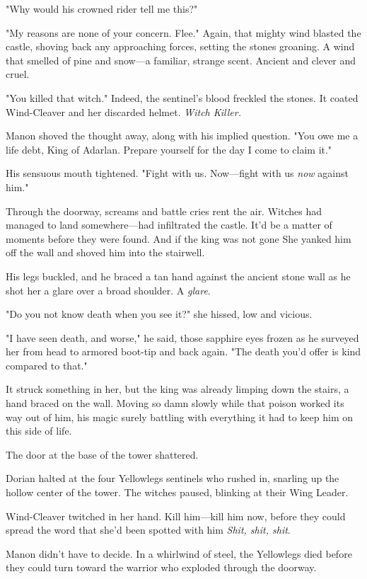 "Why would his crowned rider tell me this?"

"My reasons are none of your concern.
Flee."
Again, that mighty wind blasted the castle, shoving back any approaching forces, setting the stones groaning.
A wind that smelled of pine and snow---a familiar, strange scent.
Ancient and clever and cruel.

"You killed that witch."
Indeed, the sentinel's blood freckled the stones.
It coated Wind-Cleaver and her discarded helmet.
\emph{Witch Killer.}

Manon shoved the thought away, along with his implied question.
"You owe me a life debt, King of Adarlan.
Prepare yourself for the day I come to claim it."

His sensuous mouth tightened.
"Fight with us.
Now---fight with us \emph{now} against him."

Through the doorway, screams and battle cries rent the air.
Witches had managed to land somewhere---had infiltrated the castle.
It'd be a matter of moments before they were found.
And if the king was not gone 
She yanked him off the wall and shoved him into the stairwell.

His legs buckled, and he braced a tan hand against the ancient stone wall as he shot her a glare over a broad shoulder.
A \emph{glare}.

"Do you not know death when you see it?"
she hissed, low and vicious.

"I have seen death, and worse," he said, those sapphire eyes frozen as he surveyed her from head to armored boot-tip and back again.
"The death you'd offer is kind compared to that."

It struck something in her, but the king was already limping down the stairs, a hand braced on the wall.
Moving so damn slowly while that poison worked its way out of him, his magic surely battling with everything it had to keep him on this side of life.

The door at the base of the tower shattered.

Dorian halted at the four Yellowlegs sentinels who rushed in, snarling up the hollow center of the tower.
The witches paused, blinking at their Wing Leader.

Wind-Cleaver twitched in her hand.
Kill him---kill him now, before they could spread the word that she'd been spotted with him 
\emph{Shit, shit, shit}.

Manon didn't have to decide.
In a whirlwind of steel, the Yellowlegs died before they could turn toward the warrior who exploded through the doorway.

